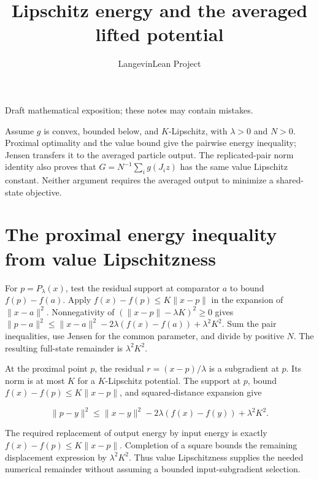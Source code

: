 \documentclass[11pt,a4paper]{article}
\title{\texorpdfstring{Lipschitz energy and the averaged lifted potential}{Lipschitz energy and the averaged lifted potential}}
\author{LangevinLean Project}
\date{}
\begin{document}
\maketitle
Draft mathematical exposition; these notes may contain mistakes.


Assume \(g\) is convex, bounded below, and \(K\)-Lipschitz, with \(\lambda>0\) and \(N>0\). Proximal optimality and the value bound give the pairwise energy inequality; Jensen transfers it to the averaged particle output. The replicated-pair norm identity also proves that \(G=N^{-1}\sum_i g(J_i z)\) has the same value Lipschitz constant. Neither argument requires the averaged output to minimize a shared-state objective.


\section{\texorpdfstring{The proximal energy inequality from value Lipschitzness}{The proximal energy inequality from value Lipschitzness}}


For \(p=P_\lambda(x)\), test the residual support at comparator \(a\) to bound \(f(p)-f(a)\). Apply \(f(x)-f(p)\le K\|x-p\|\) in the expansion of \(\|x-a\|^2\). Nonnegativity of \((\|x-p\|-\lambda K)^2\ge0\) gives \(\|p-a\|^2\le\|x-a\|^2-2\lambda(f(x)-f(a))+\lambda^2K^2\). Sum the pair inequalities, use Jensen for the common parameter, and divide by positive \(N\). The resulting full-state remainder is \(\lambda^2K^2\).



At the proximal point \(p\), the residual \(r=(x-p)/\lambda\) is a subgradient at \(p\). Its norm is at most \(K\) for a \(K\)-Lipschitz potential. The support at \(p\), bound \(f(x)-f(p)\le K\|x-p\|\), and squared-distance expansion give

\[\|p-y\|^2\le\|x-y\|^2-2\lambda(f(x)-f(y))+\lambda^2K^2.\]

The required replacement of output energy by input energy is exactly \(f(x)-f(p)\le K\|x-p\|\). Completion of a square bounds the remaining displacement expression by \(\lambda^2K^2\). Thus value Lipschitzness supplies the needed numerical remainder without assuming a bounded input-subgradient selection.
\end{document}
